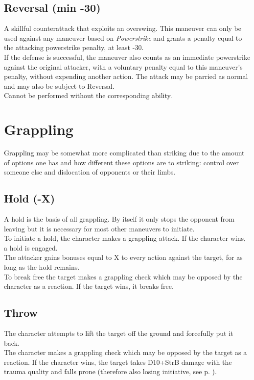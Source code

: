 \subsection*{Reversal (min -30)}
A skillful counterattack that exploits an overswing. This maneuver can only be used against any maneuver based on \emph{Powerstrike} and grants a penalty equal to the attacking powerstrike penalty, at least -30.\\
If the defense is successful, the maneuver also counts as an immediate powerstrike against the original attacker, with a voluntary penalty equal to this maneuver’s penalty, without expending another action. The attack may be parried as normal and may also be subject to Reversal.\\
Cannot be performed without the corresponding ability.

\section{Grappling}
Grappling may be somewhat more complicated than striking due to the amount of options one has and how different these options are to striking: control over someone else and dislocation of opponents or their limbs.
\subsection*{Hold (-X)}
A hold is the basis of all grappling. By itself it only stops the opponent from leaving but it is necessary for most other maneuvers to initiate.\\
To initiate a hold, the character makes a grappling attack. If the character wins, a hold is engaged.\\
The attacker gains bonuses equal to X to every action against the target, for as long as the hold remains.\\
To break free the target makes a grappling check which may be opposed by the character as a reaction. If the target wins, it breaks free.
\subsection*{Throw}
The character attempts to lift the target off the ground and forcefully put it back.\\
The character makes a grappling check which may be opposed by the target as a reaction. If the character wins, the target takes D10+StrB damage with the trauma quality and falls prone (therefore also losing initiative, see p. \pageref{subsec:variableini}).
